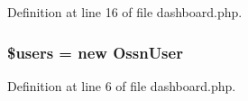 Definition at line 16 of file dashboard.\+php.

\subsubsection[{\texorpdfstring{\$users}{$users}}]{\setlength{\rightskip}{0pt plus 5cm}\$users = new {\bf Ossn\+User}}\hypertarget{dashboard_8php_a28005d22fa7ef2dfe215ad886b497d9c}{}\label{dashboard_8php_a28005d22fa7ef2dfe215ad886b497d9c}


Definition at line 6 of file dashboard.\+php.

